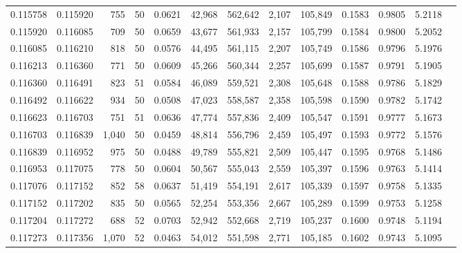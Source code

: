 \begin{tabular}{rrrrrrrrrrrrr}
0.115758 & 0.115920 &   755 &  50 &                                     0.0621 &  42,968 & 562,642 &   2,107 & 105,849 & 0.1583 & 0.9805 & 5.2118 \\
0.115920 & 0.116085 &   709 &  50 &                                     0.0659 &  43,677 & 561,933 &   2,157 & 105,799 & 0.1584 & 0.9800 & 5.2052 \\
0.116085 & 0.116210 &   818 &  50 &                                     0.0576 &  44,495 & 561,115 &   2,207 & 105,749 & 0.1586 & 0.9796 & 5.1976 \\
0.116213 & 0.116360 &   771 &  50 &                                     0.0609 &  45,266 & 560,344 &   2,257 & 105,699 & 0.1587 & 0.9791 & 5.1905 \\
0.116360 & 0.116491 &   823 &  51 &                                     0.0584 &  46,089 & 559,521 &   2,308 & 105,648 & 0.1588 & 0.9786 & 5.1829 \\
0.116492 & 0.116622 &   934 &  50 &                                     0.0508 &  47,023 & 558,587 &   2,358 & 105,598 & 0.1590 & 0.9782 & 5.1742 \\
0.116623 & 0.116703 &   751 &  51 &                                     0.0636 &  47,774 & 557,836 &   2,409 & 105,547 & 0.1591 & 0.9777 & 5.1673 \\
0.116703 & 0.116839 & 1,040 &  50 &                                     0.0459 &  48,814 & 556,796 &   2,459 & 105,497 & 0.1593 & 0.9772 & 5.1576 \\
0.116839 & 0.116952 &   975 &  50 &                                     0.0488 &  49,789 & 555,821 &   2,509 & 105,447 & 0.1595 & 0.9768 & 5.1486 \\
0.116953 & 0.117075 &   778 &  50 &                                     0.0604 &  50,567 & 555,043 &   2,559 & 105,397 & 0.1596 & 0.9763 & 5.1414 \\
0.117076 & 0.117152 &   852 &  58 &                                     0.0637 &  51,419 & 554,191 &   2,617 & 105,339 & 0.1597 & 0.9758 & 5.1335 \\
0.117152 & 0.117202 &   835 &  50 &                                     0.0565 &  52,254 & 553,356 &   2,667 & 105,289 & 0.1599 & 0.9753 & 5.1258 \\
0.117204 & 0.117272 &   688 &  52 &                                     0.0703 &  52,942 & 552,668 &   2,719 & 105,237 & 0.1600 & 0.9748 & 5.1194 \\
0.117273 & 0.117356 & 1,070 &  52 &                                     0.0463 &  54,012 & 551,598 &   2,771 & 105,185 & 0.1602 & 0.9743 & 5.1095 \\

\end{tabular}

